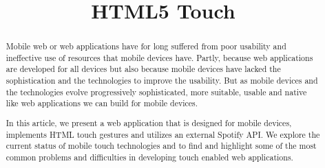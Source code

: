 \documentclass[conference]{IEEEtran}
\begin{document}
%
\title{HTML5 Touch}

\author{
\and
{}
\and
{}
}





\maketitle


\begin{abstract}





Mobile web or web applications have for long suffered from poor usability and ineffective use of resources that mobile devices have. Partly, because web applications are developed for all devices but also because mobile devices have lacked the sophistication and the technologies to improve the usability. But as mobile devices and the technologies evolve progressively sophisticated, more suitable, usable and native like web applications we can build for mobile devices.

In this article, we present a web application that is designed for mobile devices, implements HTML touch gestures and utilizes an external Spotify API. We explore the current status of mobile touch technologies and to find and highlight some of the most common problems and difficulties in developing touch enabled web applications. 


\end{abstract}
\end{document}
